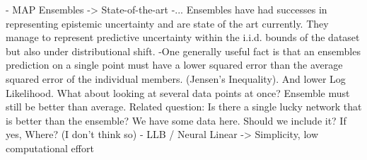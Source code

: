 \documentclass[../thesis.tex]{subfiles}
\begin{document}
- MAP Ensembles -> State-of-the-art
    -... Ensembles have had successes in representing epistemic uncertainty and are state of the art currently. They manage to represent predictive uncertainty within the i.i.d. bounds of the dataset but also under distributional shift.
    -One generally useful fact is that an ensembles prediction on a single point must have a lower squared error than the average squared error of the individual members. (Jensen's Inequality). And lower Log Likelihood.
    What about looking at several data points at once? Ensemble must still be better than average.
    Related question: Is there a single lucky network that is better than the ensemble? 
    We have some data here. Should we include it? If yes, Where? (I don't think so)
- LLB / Neural Linear -> Simplicity, low computational effort
\end{document}
